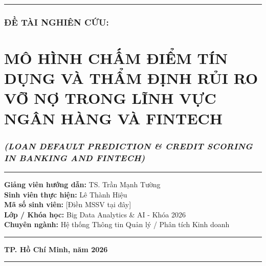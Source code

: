 \documentclass[
  13pt,
  a4paper,
]{report}
\begin{document}
\begin{center}\rule{0.5\linewidth}{0.5pt}\end{center}

\subsection{\texorpdfstring{\textbf{ĐỀ TÀI NGHIÊN
CỨU:}}{ĐỀ TÀI NGHIÊN CỨU:}}\label{ux111ux1ec1-tuxe0i-nghiuxean-cux1ee9u}


\chapter{\texorpdfstring{\textbf{MÔ HÌNH CHẤM ĐIỂM TÍN DỤNG VÀ THẨM ĐỊNH
RỦI RO VỠ NỢ TRONG LĨNH VỰC NGÂN HÀNG VÀ
FINTECH}}{MÔ HÌNH CHẤM ĐIỂM TÍN DỤNG VÀ THẨM ĐỊNH RỦI RO VỠ NỢ TRONG LĨNH VỰC NGÂN HÀNG VÀ FINTECH}}\label{muxf4-huxecnh-chux1ea5m-ux111iux1ec3m-tuxedn-dux1ee5ng-vuxe0-thux1ea9m-ux111ux1ecbnh-rux1ee7i-ro-vux1ee1-nux1ee3-trong-lux129nh-vux1ef1c-nguxe2n-huxe0ng-vuxe0-fintech}

\subsection{\texorpdfstring{\emph{(LOAN DEFAULT PREDICTION \& CREDIT
SCORING IN BANKING AND
FINTECH)}}{(LOAN DEFAULT PREDICTION \& CREDIT SCORING IN BANKING AND FINTECH)}}\label{loan-default-prediction-credit-scoring-in-banking-and-fintech}

\begin{center}\rule{0.5\linewidth}{0.5pt}\end{center}

\textbf{Giảng viên hướng dẫn:} TS. Trần Mạnh Tường\\
\textbf{Sinh viên thực hiện:} Lê Thành Hiệu\\
\textbf{Mã số sinh viên:} {[}Điền MSSV tại đây{]}\\
\textbf{Lớp / Khóa học:} Big Data Analytics \& AI - Khóa 2026\\
\textbf{Chuyên ngành:} Hệ thống Thông tin Quản lý / Phân tích Kinh doanh

\begin{center}\rule{0.5\linewidth}{0.5pt}\end{center}

\textbf{TP. Hồ Chí Minh, năm 2026}

\newpage

\begin{center}\rule{0.5\linewidth}{0.5pt}\end{center}
\end{document}
